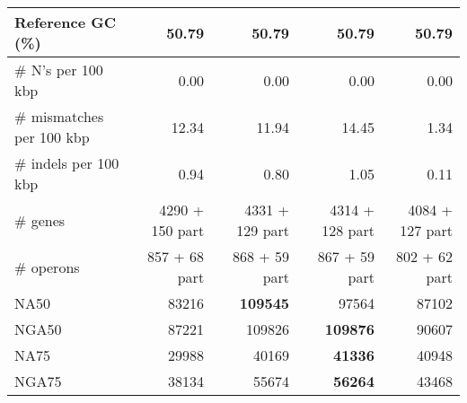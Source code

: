 \documentclass[12pt,a4paper]{article}
\begin{document}
\begin{table}[ht]
\begin{center}
\begin{tabular}{|l*{4}{|r}|}
Reference GC (\%) & 50.79 & 50.79 & 50.79 & 50.79 \\ \hline
\# N's per 100 kbp & 0.00 & 0.00 & 0.00 & 0.00 \\ \hline
\# mismatches per 100 kbp & 12.34 & 11.94 & 14.45 & 1.34 \\ \hline
\# indels per 100 kbp & 0.94 & 0.80 & 1.05 & 0.11 \\ \hline
\# genes & 4290 + 150 part & 4331 + 129 part & 4314 + 128 part & 4084 + 127 part \\ \hline
\# operons & 857 + 68 part & 868 + 59 part & 867 + 59 part & 802 + 62 part \\ \hline
NA50 & 83216 & {\bf 109545} & 97564 & 87102 \\ \hline
NGA50 & 87221 & 109826 & {\bf 109876} & 90607 \\ \hline
NA75 & 29988 & 40169 & {\bf 41336} & 40948 \\ \hline
NGA75 & 38134 & 55674 & {\bf 56264} & 43468 \\ \hline
\end{tabular}
\end{center}
\end{table}
\end{document}
